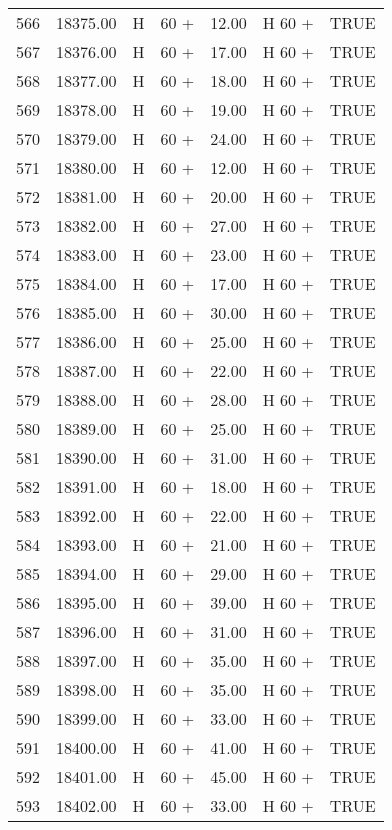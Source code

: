 \begin{table}[ht]
\begin{tabular}{rrllrll}
  566 & 18375.00 & H & 60 + & 12.00 & H 60 + & TRUE \\ 
  567 & 18376.00 & H & 60 + & 17.00 & H 60 + & TRUE \\ 
  568 & 18377.00 & H & 60 + & 18.00 & H 60 + & TRUE \\ 
  569 & 18378.00 & H & 60 + & 19.00 & H 60 + & TRUE \\ 
  570 & 18379.00 & H & 60 + & 24.00 & H 60 + & TRUE \\ 
  571 & 18380.00 & H & 60 + & 12.00 & H 60 + & TRUE \\ 
  572 & 18381.00 & H & 60 + & 20.00 & H 60 + & TRUE \\ 
  573 & 18382.00 & H & 60 + & 27.00 & H 60 + & TRUE \\ 
  574 & 18383.00 & H & 60 + & 23.00 & H 60 + & TRUE \\ 
  575 & 18384.00 & H & 60 + & 17.00 & H 60 + & TRUE \\ 
  576 & 18385.00 & H & 60 + & 30.00 & H 60 + & TRUE \\ 
  577 & 18386.00 & H & 60 + & 25.00 & H 60 + & TRUE \\ 
  578 & 18387.00 & H & 60 + & 22.00 & H 60 + & TRUE \\ 
  579 & 18388.00 & H & 60 + & 28.00 & H 60 + & TRUE \\ 
  580 & 18389.00 & H & 60 + & 25.00 & H 60 + & TRUE \\ 
  581 & 18390.00 & H & 60 + & 31.00 & H 60 + & TRUE \\ 
  582 & 18391.00 & H & 60 + & 18.00 & H 60 + & TRUE \\ 
  583 & 18392.00 & H & 60 + & 22.00 & H 60 + & TRUE \\ 
  584 & 18393.00 & H & 60 + & 21.00 & H 60 + & TRUE \\ 
  585 & 18394.00 & H & 60 + & 29.00 & H 60 + & TRUE \\ 
  586 & 18395.00 & H & 60 + & 39.00 & H 60 + & TRUE \\ 
  587 & 18396.00 & H & 60 + & 31.00 & H 60 + & TRUE \\ 
  588 & 18397.00 & H & 60 + & 35.00 & H 60 + & TRUE \\ 
  589 & 18398.00 & H & 60 + & 35.00 & H 60 + & TRUE \\ 
  590 & 18399.00 & H & 60 + & 33.00 & H 60 + & TRUE \\ 
  591 & 18400.00 & H & 60 + & 41.00 & H 60 + & TRUE \\ 
  592 & 18401.00 & H & 60 + & 45.00 & H 60 + & TRUE \\ 
  593 & 18402.00 & H & 60 + & 33.00 & H 60 + & TRUE \\ 

\end{tabular}
\end{table}
